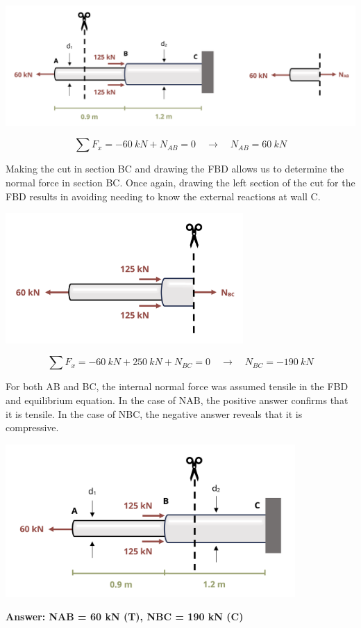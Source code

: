 \documentclass[
  letterpaper,
  DIV=11,
  numbers=noendperiod]{scrreprt}
\begin{document}
\begin{tcolorbox}
\begin{tcolorbox}
\begin{center}
\includegraphics{images/CH1 PNGs/example 1.5 part 2.png}
\end{center}

\[
\sum F_x=-60{~kN}+N_{A B}=0 \quad\rightarrow\quad N_{A B}=60{~kN}
\]

Making the cut in section BC and drawing the FBD allows us to determine
the normal force in section BC. Once again, drawing the left section of
the cut for the FBD results in avoiding needing to know the external
reactions at wall C.

\begin{center}
\includegraphics[width=3.5625in,height=\textheight]{images/CH1 PNGs/example 1.5 part 3.png}
\end{center}

\[
\sum F_x=-60{~kN}+250{~kN}+N_{BC}=0 \quad\rightarrow\quad N_{BC}=-190{~kN}
\]

For both AB and BC, the internal normal force was assumed tensile in the
FBD and equilibrium equation. In the case of NAB, the positive answer
confirms that it is tensile. In the case of NBC, the negative answer
reveals that it is compressive.

\begin{center}
\includegraphics[width=4.34375in,height=\textheight]{images/CH1 PNGs/example 1.5 part 4.png}
\end{center}

\textbf{Answer: NAB = 60 kN (T), NBC = 190 kN (C)}

\end{tcolorbox}

\end{tcolorbox}
\end{document}
